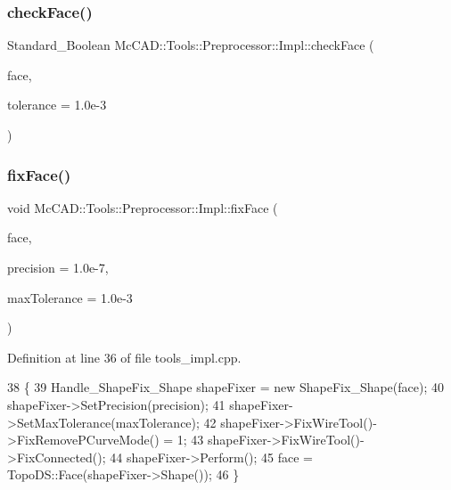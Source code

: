 \subsubsection{\texorpdfstring{check\+Face()}{checkFace()}\hspace{0.1cm}{\footnotesize\ttfamily [2/2]}}
{\footnotesize\ttfamily Standard\+\_\+\+Boolean Mc\+C\+A\+D\+::\+Tools\+::\+Preprocessor\+::\+Impl\+::check\+Face (\begin{DoxyParamCaption}\item[{const Topo\+D\+S\+\_\+\+Face \&}]{face,  }\item[{Standard\+\_\+\+Real}]{tolerance = {\ttfamily 1.0e-\/3} }\end{DoxyParamCaption})}

\mbox{\label{classMcCAD_1_1Tools_1_1Preprocessor_1_1Impl_a2ca942ed4ba9269d9291000456b6d8dd}} 
\subsubsection{\texorpdfstring{fix\+Face()}{fixFace()}\hspace{0.1cm}{\footnotesize\ttfamily [1/2]}}
{\footnotesize\ttfamily void Mc\+C\+A\+D\+::\+Tools\+::\+Preprocessor\+::\+Impl\+::fix\+Face (\begin{DoxyParamCaption}\item[{Topo\+D\+S\+\_\+\+Face \&}]{face,  }\item[{Standard\+\_\+\+Real}]{precision = {\ttfamily 1.0e-\/7},  }\item[{Standard\+\_\+\+Real}]{max\+Tolerance = {\ttfamily 1.0e-\/3} }\end{DoxyParamCaption})}



Definition at line 36 of file tools\+\_\+impl.\+cpp.


\begin{DoxyCode}
38                                                                      \{
39     Handle\_ShapeFix\_Shape shapeFixer = \textcolor{keyword}{new} ShapeFix\_Shape(face);
40     shapeFixer->SetPrecision(precision);
41     shapeFixer->SetMaxTolerance(maxTolerance);
42     shapeFixer->FixWireTool()->FixRemovePCurveMode() = 1;
43     shapeFixer->FixWireTool()->FixConnected();
44     shapeFixer->Perform();
45     face = TopoDS::Face(shapeFixer->Shape());
46 \}
\end{DoxyCode}
\mbox{\label{classMcCAD_1_1Tools_1_1Preprocessor_1_1Impl_a2ca942ed4ba9269d9291000456b6d8dd}} 
